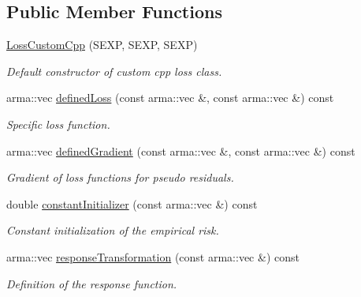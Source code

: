 \subsection*{Public Member Functions}
\begin{DoxyCompactItemize}
\item 
\mbox{\hyperlink{classloss_1_1_loss_custom_cpp_a4393e1067c97d6cc1200c7a4659f1f13}{Loss\+Custom\+Cpp}} (S\+E\+XP, S\+E\+XP, S\+E\+XP)
\begin{DoxyCompactList}\small\item\em Default constructor of custom cpp loss class. \end{DoxyCompactList}\item 
arma\+::vec \mbox{\hyperlink{classloss_1_1_loss_custom_cpp_abb0c51701c90ce115cd0a0440e5b28f8}{defined\+Loss}} (const arma\+::vec \&, const arma\+::vec \&) const
\begin{DoxyCompactList}\small\item\em Specific loss function. \end{DoxyCompactList}\item 
arma\+::vec \mbox{\hyperlink{classloss_1_1_loss_custom_cpp_a8db4924e9a9866c00adf4a8cfd3ec38a}{defined\+Gradient}} (const arma\+::vec \&, const arma\+::vec \&) const
\begin{DoxyCompactList}\small\item\em Gradient of loss functions for pseudo residuals. \end{DoxyCompactList}\item 
double \mbox{\hyperlink{classloss_1_1_loss_custom_cpp_af6d7652231c313abe11009e44b51d0b1}{constant\+Initializer}} (const arma\+::vec \&) const
\begin{DoxyCompactList}\small\item\em Constant initialization of the empirical risk. \end{DoxyCompactList}\item 
arma\+::vec \mbox{\hyperlink{classloss_1_1_loss_custom_cpp_ace7a23f6b0da58d12f1dec29e26acf18}{response\+Transformation}} (const arma\+::vec \&) const
\begin{DoxyCompactList}\small\item\em Definition of the response function. \end{DoxyCompactList}\end{DoxyCompactItemize}
